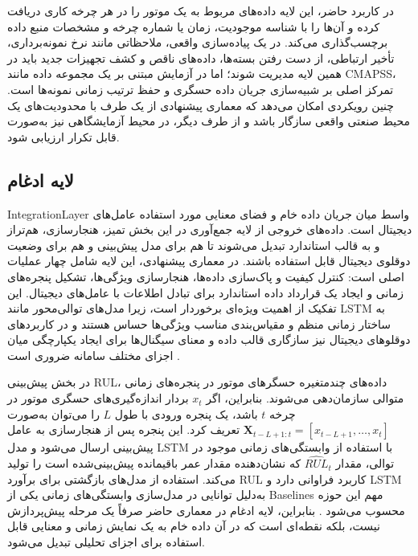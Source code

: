 \documentclass[a4paper,fleqn]{report}
\begin{document}
در کاربرد حاضر، این لایه داده‌های مربوط به یک موتور را در هر چرخه کاری دریافت کرده و آن‌ها را با شناسه موجودیت، زمان یا شماره چرخه و مشخصات منبع داده برچسب‌گذاری می‌کند. در یک پیاده‌سازی واقعی، ملاحظاتی مانند نرخ نمونه‌برداری، تأخیر ارتباطی، از دست رفتن بسته‌ها، داده‌های ناقص و کشف تجهیزات جدید باید در همین لایه مدیریت شوند؛ اما در آزمایش مبتنی بر یک مجموعه داده مانند \gls{CMAPSS}، تمرکز اصلی بر شبیه‌سازی جریان داده حسگری و حفظ ترتیب زمانی نمونه‌ها است. چنین رویکردی امکان می‌دهد که معماری پیشنهادی از یک طرف با محدودیت‌های یک محیط صنعتی واقعی سازگار باشد و از طرف دیگر، در محیط آزمایشگاهی نیز به‌صورت قابل تکرار ارزیابی شود.


\subsection{لایه ادغام}
\label{sec:layer-integration}

\gls{IntegrationLayer} واسط میان جریان داده خام و فضای معنایی مورد استفاده عامل‌های دیجیتال است. داده‌های خروجی از لایه جمع‌آوری در این بخش تمیز، هنجارسازی، هم‌تراز و به قالب استاندارد تبدیل می‌شوند تا هم برای مدل پیش‌بینی و هم برای وضعیت دوقلوی دیجیتال قابل استفاده باشند. در معماری پیشنهادی، این لایه شامل چهار عملیات اصلی است: کنترل کیفیت و پاک‌سازی داده‌ها، هنجارسازی ویژگی‌ها، تشکیل پنجره‌های زمانی و ایجاد یک قرارداد داده استاندارد برای تبادل اطلاعات با عامل‌های دیجیتال. این تفکیک از اهمیت ویژه‌ای برخوردار است، زیرا مدل‌های توالی‌محور مانند LSTM به ساختار زمانی منظم و مقیاس‌بندی مناسب ویژگی‌ها حساس هستند \cite{heimes2008recurrent} و در کاربردهای  دوقلو‌های دیجیتال نیز سازگاری قالب داده و معنای سیگنال‌ها برای ایجاد یکپارچگی میان اجزای مختلف سامانه ضروری است \cite{qi2021enabling}.

در بخش پیش‌بینی \gls{RUL}، داده‌های چندمتغیره حسگرهای موتور در پنجره‌های زمانی متوالی سازمان‌دهی می‌شوند. بنابراین، اگر $x_t$ بردار اندازه‌گیری‌های حسگری موتور در چرخه $t$ باشد، یک پنجره ورودی با طول $L$ را می‌توان به‌صورت $\mathbf{X}_{t-L+1:t}=[x_{t-L+1},\ldots,x_t]$ تعریف کرد. این پنجره پس از هنجارسازی به عامل پیش‌بینی ارسال می‌شود و مدل LSTM با استفاده از وابستگی‌های زمانی موجود در توالی، مقدار $\widehat{RUL}_t$ که نشان‌دهنده مقدار عمر باقیمانده پیش‌بینی‌شده است را تولید می‌کند. استفاده از مدل‌های بازگشتی برای برآورد \gls{RUL} کاربرد فراوانی دارد و LSTM به‌دلیل توانایی در مدل‌سازی وابستگی‌های زمانی یکی از \glspl{Baseline} مهم این حوزه محسوب می‌شود \cite{heimes2008recurrent,park2026hybriddt}. بنابراین، لایه ادغام در معماری حاضر صرفاً یک مرحله پیش‌پردازش نیست، بلکه نقطه‌ای است که در آن داده خام به یک نمایش زمانی و معنایی قابل استفاده برای اجزای تحلیلی تبدیل می‌شود.
\end{document}
